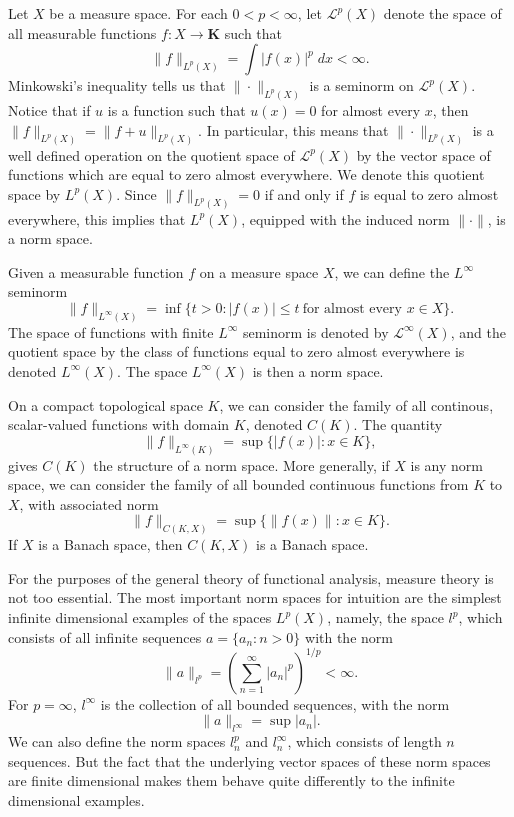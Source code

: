 \begin{example}
    Let $X$ be a measure space. For each $0 < p < \infty$, let $\mathcal{L}^p(X)$ denote the space of all measurable functions $f: X \to \mathbf{K}$ such that
    \[ \| f \|_{L^p(X)} = \int |f(x)|^p\; dx < \infty. \]
    Minkowski's inequality tells us that $\| \cdot \|_{L^p(X)}$ is a seminorm on $\mathcal{L}^p(X)$. Notice that if $u$ is a function such that $u(x) = 0$ for almost every $x$, then $\| f \|_{L^p(X)} = \| f + u \|_{L^p(X)}$. In particular, this means that $\| \cdot \|_{L^p(X)}$ is a well defined operation on the quotient space of $\mathcal{L}^p(X)$ by the vector space of functions which are equal to zero almost everywhere. We denote this quotient space by $L^p(X)$. Since $\| f \|_{L^p(X)} = 0$ if and only if $f$ is equal to zero almost everywhere, this implies that $L^p(X)$, equipped with the induced norm $\| \cdot \|$, is a norm space.
\end{example}

\begin{example}
    Given a measurable function $f$ on a measure space $X$, we can define the $L^\infty$ seminorm
    \[ \| f \|_{L^\infty(X)} = \inf \{ t > 0: |f(x)| \leq t\ \text{for almost every $x \in X$} \}. \]
    The space of functions with finite $L^\infty$ seminorm is denoted by $\mathcal{L}^\infty(X)$, and the quotient space by the class of functions equal to zero almost everywhere is denoted $L^\infty(X)$. The space $L^\infty(X)$ is then a norm space.
\end{example}

\begin{example}
    On a compact topological space $K$, we can consider the family of all continous, scalar-valued functions with domain $K$, denoted $C(K)$. The quantity
    \[ \| f \|_{L^\infty(K)} = \sup \{ |f(x)|: x \in K \}, \]
    gives $C(K)$ the structure of a norm space. More generally, if $X$ is any norm space, we can consider the family of all bounded continuous functions from $K$ to $X$, with associated norm
    \[ \| f \|_{C(K,X)} = \sup \{ \| f(x) \|: x \in K \}. \]
    If $X$ is a Banach space, then $C(K,X)$ is a Banach space.
\end{example}

For the purposes of the general theory of functional analysis, measure theory is not too essential. The most important norm spaces for intuition are the simplest infinite dimensional examples of the spaces $L^p(X)$, namely, the space $l^p$, which consists of all infinite sequences $a = \{ a_n : n > 0 \}$ with the norm
%
\[ \| a \|_{l^p} = \left( \sum_{n = 1}^\infty |a_n|^p \right)^{1/p} < \infty. \]
%
For $p = \infty$, $l^\infty$ is the collection of all bounded sequences, with the norm
%
\[ \| a \|_{l^\infty} = \sup |a_n|. \]
%
We can also define the norm spaces $l^p_n$ and $l^\infty_n$, which consists of length $n$ sequences. But the fact that the underlying vector spaces of these norm spaces are finite dimensional makes them behave quite differently to the infinite dimensional examples. 

